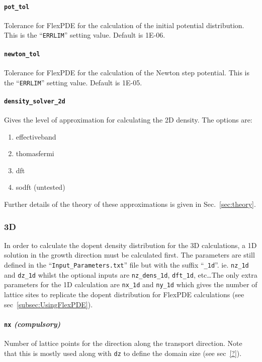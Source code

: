 \documentclass[12pt]{article}
\begin{document}
\paragraph{\texttt{pot\_tol}}
Tolerance for FlexPDE for the calculation of the initial potential distribution.
This is the ``\texttt{ERRLIM}'' setting value.  Default is 1E-06.

\paragraph{\texttt{newton\_tol}}
Tolerance for FlexPDE for the calculation of the Newton step potential.
This is the ``\texttt{ERRLIM}'' setting value.  Default is 1E-05.

\paragraph{\texttt{density\_solver\_2d}}
Gives the level of approximation for calculating the 2D density.  The options are:
\begin{enumerate}
    \item effectiveband
    \item thomasfermi
    \item dft
    \item sodft (untested)
\end{enumerate}
Further details of the theory of these approximations is given in Sec.~\ref{sec:theory}.


\subsubsection{3D}

In order to calculate the dopent density distribution for the 3D calculations, a 1D
solution in the growth direction must be calculated first.  The parameters are still
defined in the ``\texttt{Input\_Parameters.txt}'' file but with the suffix ``\texttt{\_1d}''.
ie. \texttt{nz\_1d} and \texttt{dz\_1d} whilst the optional inputs are \texttt{nz\_dens\_1d},
\texttt{dft\_1d}, etc\ldots  The only extra parameters for the 1D calculation are
\texttt{nx\_1d} and \texttt{ny\_1d} which gives the number of lattice sites to replicate
the dopent distribution for FlexPDE calculations (see sec~\ref{subsec:UsingFlexPDE}).

\paragraph{\texttt{nx} \emph{(compulsory)}}
Number of lattice points for the direction along the transport direction.  Note
that this is mostly used along with \texttt{dz} to define the domain size (see sec~\ref{?}).
\end{document}
